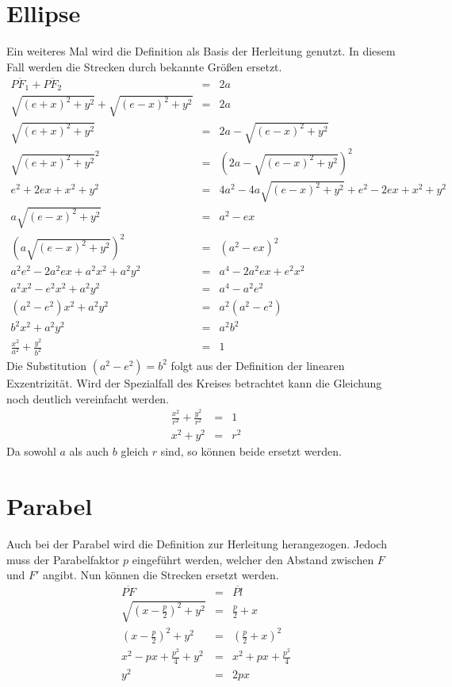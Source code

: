 \section{Ellipse}
Ein weiteres Mal wird die Definition als Basis der Herleitung \cite[S.11]{Scheid:1985} genutzt. In diesem Fall werden die Strecken durch bekannte Größen ersetzt.
\begin{displaymath}
	\begin{array}{rcl}
		\overline{{PF}_1} + \overline{{PF}_2} & = & 2a\\
		\sqrt{{(e+x)}^2 + y^2} + \sqrt{{(e-x)}^2 + y^2} & = & 2a\\
		\sqrt{{(e+x)}^2 + y^2} & = & 2a - \sqrt{{(e-x)}^2 + y^2}\\
		\sqrt{{(e+x)}^2 + y^2}^2 & = & \left (2a - \sqrt{{(e-x)}^2 + y^2}\right )^2\\
		e^2 + 2ex + x^2 + y^2 & = & 4a^2 - 4a \sqrt{(e-x)^2+y^2} + e^2 - 2ex + x^2 + y^2\\
		a\sqrt{{(e-x)}^2 + y^2} & = & a^2 - ex\\
		\left (a\sqrt{{(e-x)}^2 + y^2}\right )^2 & = & (a^2 - ex)^2\\
		a^2e^2 - 2a^2ex + a^2x^2 + a^2y^2 &=& a^4 - 2a^2ex + e^2x^2\\
		a^2x^2 - e^2x^2 + a^2y^2 &=& a^4 - a^2e^2\\
		\left(a^2 - e^2\right)x^2 + a^2y^2 &=& a^2\left(a^2 - e^2\right)\\
		b^2x^2 + a^2y^2 &=& a^2b^2\\
		\frac{x^2}{a^2} + \frac{y^2}{b^2} &=& 1
	\end{array}
\end{displaymath}
Die Substitution $\left(a^2 - e^2\right) = b^2$ folgt aus der Definition der linearen Exzentrizität. Wird der Spezialfall des Kreises betrachtet kann die Gleichung noch deutlich vereinfacht werden.
\begin{displaymath}
	\begin{array}{rcl}
		\frac{x^2}{r^2} + \frac{y^2}{r^2} &=& 1\\
		x^2 + y^2 &=& r^2
	\end{array}
\end{displaymath}
Da sowohl $a$ als auch $b$ gleich $r$ sind, so können beide ersetzt werden. 
\section{Parabel}
Auch bei der Parabel wird die Definition zur Herleitung\cite[S.45]{Scheid:1985} herangezogen. Jedoch muss der Parabelfaktor $p$ eingeführt werden, welcher den Abstand zwischen $F$ und $F'$ angibt. Nun können die Strecken ersetzt werden.
\begin{displaymath}
	\begin{array}{rcl}
		\overline{PF} &=& \overline{Pl}\\
		\sqrt{\left(x-\frac{p}{2}\right)^2+y^2} &=& \frac{p}{2} + x\\
		\left(x-\frac{p}{2}\right)^2+y^2 &=& \left(\frac{p}{2} + x\right)^2\\
		x^2 - px + \frac{p^2}{4} + y^2 &=& x^2 + px + \frac{p^2}{4}\\
		y^2 &=& 2px
	\end{array}
\end{displaymath}
